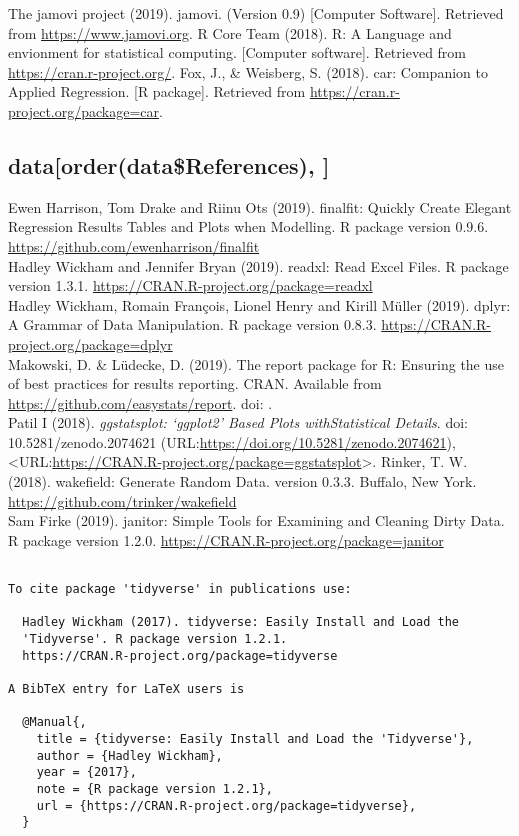 \documentclass[]{article}
\begin{document}
The jamovi project (2019). jamovi. (Version 0.9) {[}Computer
Software{]}. Retrieved from \url{https://www.jamovi.org}. R Core Team
(2018). R: A Language and envionment for statistical computing.
{[}Computer software{]}. Retrieved from
\url{https://cran.r-project.org/}. Fox, J., \& Weisberg, S. (2018). car:
Companion to Applied Regression. {[}R package{]}. Retrieved from
\url{https://cran.r-project.org/package=car}.

\hypertarget{dataorderdatareferences}{%
\subsection{data{[}order(data\$References),
{]}}\label{dataorderdatareferences}}

Ewen Harrison, Tom Drake and Riinu Ots (2019). finalfit: Quickly Create
Elegant Regression Results Tables and Plots when Modelling. R package
version 0.9.6. \url{https://github.com/ewenharrison/finalfit}\\
Hadley Wickham and Jennifer Bryan (2019). readxl: Read Excel Files. R
package version 1.3.1. \url{https://CRAN.R-project.org/package=readxl}\\
Hadley Wickham, Romain François, Lionel Henry and Kirill Müller (2019).
dplyr: A Grammar of Data Manipulation. R package version 0.8.3.
\url{https://CRAN.R-project.org/package=dplyr}\\
Makowski, D. \& Lüdecke, D. (2019). The report package for R: Ensuring
the use of best practices for results reporting. CRAN. Available from
\url{https://github.com/easystats/report}. doi: .\\
Patil I (2018). \emph{ggstatsplot: `ggplot2' Based Plots withStatistical
Details}. doi: 10.5281/zenodo.2074621
(URL:\url{https://doi.org/10.5281/zenodo.2074621}),
\textless URL:\url{https://CRAN.R-project.org/package=ggstatsplot}\textgreater.
Rinker, T. W. (2018). wakefield: Generate Random Data. version 0.3.3.
Buffalo, New York. \url{https://github.com/trinker/wakefield}\\
Sam Firke (2019). janitor: Simple Tools for Examining and Cleaning Dirty
Data. R package version 1.2.0.
\url{https://CRAN.R-project.org/package=janitor}

\begin{verbatim}

To cite package 'tidyverse' in publications use:

  Hadley Wickham (2017). tidyverse: Easily Install and Load the
  'Tidyverse'. R package version 1.2.1.
  https://CRAN.R-project.org/package=tidyverse

A BibTeX entry for LaTeX users is

  @Manual{,
    title = {tidyverse: Easily Install and Load the 'Tidyverse'},
    author = {Hadley Wickham},
    year = {2017},
    note = {R package version 1.2.1},
    url = {https://CRAN.R-project.org/package=tidyverse},
  }
\end{verbatim}
\end{document}
